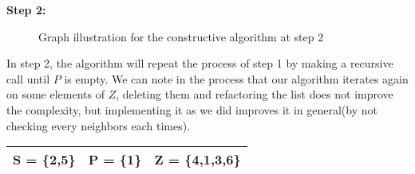     \vspace{1\baselineskip}

    \begin{minipage}{\linewidth}
        \textbf{Step 2:} \newline
        \begin{minipage}{0.4\textwidth}
            \begin{figure}[H]
                \centering
                \caption{Graph illustration for the constructive algorithm at step 2}
                \label{fig:constructive-mewc-edge-step2}
            \end{figure}
        \end{minipage}
        \begin{minipage}{0.6\textwidth}
            In step 2, the algorithm will repeat the process of step 1 by making a recursive call until $P$ is empty. We can note in the process that our algorithm iterates again on some elements of $Z$, deleting them and refactoring the list does not improve the complexity, but implementing it as we did improves it in general(by not checking every neighbors each times). 
    
            \begin{center}
                \begin{tabular}{|lll|}
                    \hline
                    S = \{2,5\} & P = \{1\} & Z = \{4,1,3,6\} \\
                    \hline
                \end{tabular}
            \end{center}
        \end{minipage}
    \end{minipage}

